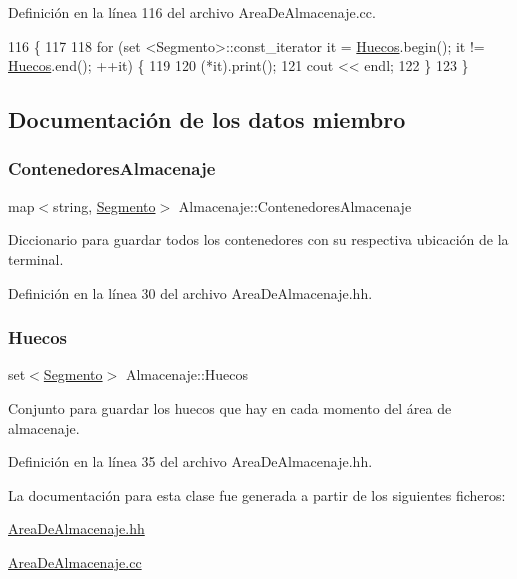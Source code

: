 Definición en la línea 116 del archivo Area\+De\+Almacenaje.\+cc.


\begin{DoxyCode}
116                                        \{
117     
118     \textcolor{keywordflow}{for} (set <Segmento>::const\_iterator it = \hyperlink{class_almacenaje_ac7f1f8559babe3ac7841bb7f9e50d79a}{Huecos}.begin(); it != \hyperlink{class_almacenaje_ac7f1f8559babe3ac7841bb7f9e50d79a}{Huecos}.end(); ++it) \{
119         
120         (*it).print();
121         cout << endl;
122     \}
123 \}
\end{DoxyCode}


\subsection{Documentación de los datos miembro}
\mbox{\label{class_almacenaje_ab3cfe0feaf244094a7e2c5225ee681e6}} 
\subsubsection{\texorpdfstring{Contenedores\+Almacenaje}{ContenedoresAlmacenaje}}
{\footnotesize\ttfamily map$<$string, \hyperlink{class_segmento}{Segmento}$>$ Almacenaje\+::\+Contenedores\+Almacenaje\hspace{0.3cm}{\ttfamily [private]}}



Diccionario para guardar todos los contenedores con su respectiva ubicación de la terminal. 



Definición en la línea 30 del archivo Area\+De\+Almacenaje.\+hh.

\mbox{\label{class_almacenaje_ac7f1f8559babe3ac7841bb7f9e50d79a}} 
\subsubsection{\texorpdfstring{Huecos}{Huecos}}
{\footnotesize\ttfamily set$<$\hyperlink{class_segmento}{Segmento}$>$ Almacenaje\+::\+Huecos\hspace{0.3cm}{\ttfamily [private]}}



Conjunto para guardar los huecos que hay en cada momento del área de almacenaje. 



Definición en la línea 35 del archivo Area\+De\+Almacenaje.\+hh.



La documentación para esta clase fue generada a partir de los siguientes ficheros\+:\begin{DoxyCompactItemize}
\item 
\hyperlink{_area_de_almacenaje_8hh}{Area\+De\+Almacenaje.\+hh}\item 
\hyperlink{_area_de_almacenaje_8cc}{Area\+De\+Almacenaje.\+cc}\end{DoxyCompactItemize}

